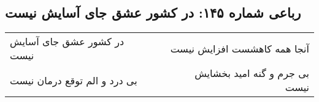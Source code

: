 \begin{center}
\section*{رباعی شماره ۱۴۵: در کشور عشق جای آسایش نیست}
\label{sec:sh145}
\begin{longtable}{l p{0.5cm} r}
در کشور عشق جای آسایش نیست
&&
آنجا همه کاهشست افزایش نیست
\\
بی درد و الم توقع درمان نیست
&&
بی جرم و گنه امید بخشایش نیست
\\
\end{longtable}
\end{center}

